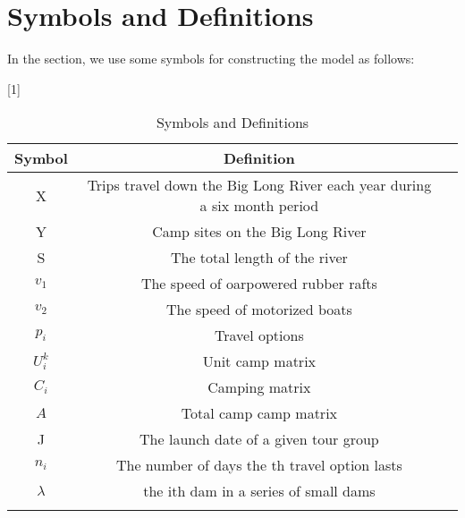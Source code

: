 \section{Symbols and Definitions }
In the section, we use some symbols for constructing the model as follows: 
\begin{table}[htbp]
	\centering
	\caption{\label{tab:Symbols}Symbols and Definitions}
	\scalebox{0.93}[1]{%
	\begin{tabular}{c c r}
		\Xhline{1.2pt}
		Symbol  & Deﬁnition \\
		\midrule
		X &  Trips travel down the Big Long River each year during a six month period \\
		Y &  Camp sites on the Big Long River \\
		S &  The total length of the river \\
		${v_1}$ &  The speed of oarpowered rubber rafts \\
		${v_2}$ &  The speed of motorized boats \\
		${p_i}$ &  Travel options \\
		$U_i^k$ &  Unit camp matrix \\
		${C_i}$ &  Camping matrix \\
		$A$ &  Total camp camp matrix \\
		J &  The launch date of a given tour group \\
		${n_i}$ &  The number of days the  th travel option lasts \\
		$\lambda $ &  the ith dam in a series of small dams \\
		\Xhline{1.2pt}
	\end{tabular}
}
\end{table}
